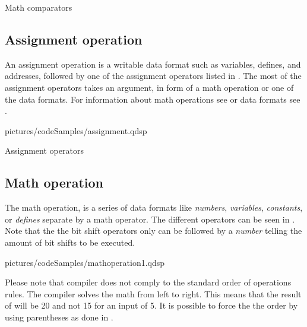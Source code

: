 \begin{table}[H]
	\centering
		
		\caption{Math comparators}
	\label{mathComparators}
\end{table}

\subsection{Assignment operation}\label{programmingLanguage_AssignmentOperation}
An assignment operation is a writable data format such as variables, defines, and addresses, followed by one of the assignment operators listed in . The most of the assignment operators takes an argument, in form of a math operation or one of the data formats. For information about math operations see  or data formats see .


  {pictures/codeSamples/assignment.qdsp}

\begin{table}[H]
	\centering
		
		\caption{Assignment operators}
		\label{assignmentOperators}
\end{table}

\subsection{Math operation}\label{programmingLanguage_MathOperation}
The math operation, is a series of data formats like \textit{numbers}, \textit{variables}, \textit{constants}, or \textit{defines} separate by a math operator. The different operators can be seen in . Note that the the bit shift operators only can be followed by a \textit{number} telling the amount of bit shifts to be executed.


  {pictures/codeSamples/mathoperation1.qdsp}

Please note that compiler does not comply to the standard order of operations rules. The compiler solves the math from left to right. This means that the result of  will be 20 and not 15 for an input of 5. It is possible to force the the order by using parentheses as done in . 

